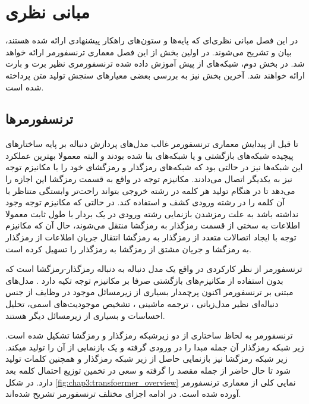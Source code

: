 \chapter{مبانی نظری}\label{chap3}
\setlength{\parindent}{2em}
\minitoc

در این فصل مبانی نظری‌ای که پایه‌ها و ستون‌های راهکار پیشنهادی ارائه شده هستند، بیان و تشریح می‌شوند. در اولین بخش از این فصل معماری ترنسفورمر ارائه خواهد شد. در بخش دوم، شبکه‌های از پیش آموزش داده شده ترنسفورمری نظیر برت و بارت ارائه خواهند شد. آخرین بخش نیز به بررسی بعضی معیارهای سنجش تولید متن پرداخته شده است.

\section{ترنسفورمرها}

تا قبل از پیدایش معماری ترنسفورمر غالب مدل‌های پردازش دنباله بر پایه‌ ساختار‌های پیچیده شبکه‌های بازگشتی و یا شبکه‌های 
بنا شده بودند و البته معمولا بهترین عملکرد این شبکه‌ها نیز در حالتی بود که شبکه‌های رمزگذار و رمزگشای خود را با مکانیزم توجه نیز به یکدیگر اتصال می‌دادند. 
مکانیزم توجه در واقع به قسمت رمزگشا این اجازه را می‌دهد تا در هنگام تولید هر کلمه در رشته خروجی بتواند راحت‌تر وابستگی متناظر با آن کلمه را در رشته ورودی کشف و استفاده کند. در حالتی که مکانیزم توجه وجود نداشته باشد به علت رمزشدن بازنمایی رشته ورودی در یک بردار با طول ثابت معمولا اطلاعات به سختی از قسمت رمزگذار به رمزگشا منتقل می‌شوند، حال آن که مکانیزم توجه با ایجاد اتصالات متعدد از رمزگذار به رمزگشا انتقال جریان اطلاعات از رمزگذار به رمزگشا و جریان مشتق از رمزگشا به رمزگذار را تسهیل کرده است.

ترنسفورمر
از نظر کارکردی در واقع یک مدل دنباله به دنباله رمزگذار-رمزگشا است که بدون استفاده از مکانیزم‌های بازگشتی صرفا بر مکانیزم توجه تکیه دارد
\cite{transformer}
. مدل‌های مبتنی بر ترنسفورمر اکنون پرچمدار
بسیاری از زیرمسائل موجود در وظایف از جنس دنباله‌ای نظیر مدل‌زبانی
،
ترجمه ماشینی
، تشخیص موجودیت‌های اسمی، تحلیل احساسات
و بسیاری از زیرمسائل دیگر هستند.

ترنسفورمر به لحاظ ساختاری از دو زیرشبکه رمزگذار و رمزگشا تشکیل شده است.   
زیر شبکه رمزگذار آن جمله مبدا را در ورودی گرفته و یک بازنمایی از آن را تولید میکند. زیر شبکه رمزگشا نیز بازنمایی حاصل از زیر شبکه رمزگذار و همچنین کلمات تولید شود تا حال حاضر از جمله مقصد را گرفته و سعی در تخمین توزیع احتمال کلمه بعد دارد. در شکل 
\ref{fig:chap3:transfoermer_overview}
نمایی کلی از معماری ترنسفورمر آورده شده است. در ادامه اجزای مختلف ترنسفورمر تشریح شده‌اند.


